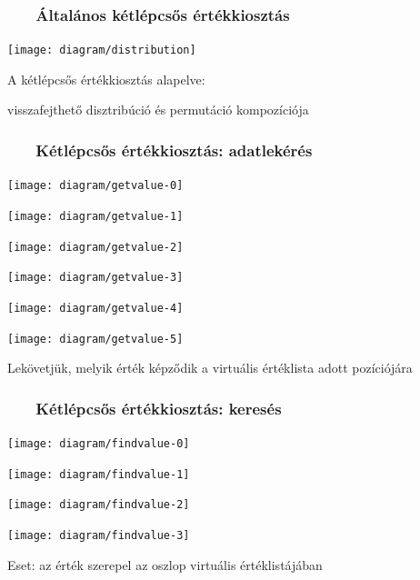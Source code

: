 \documentclass[
    aspectratio=169,
]{beamer}
\newcommand{\slidetitle}[2]{\frametitle{{\small #1 ~ \ding{226} ~ } \normalsize \textbf{#2} }}
\begin{document}
\begin{frame}
    \slidetitle{\sectionshorttitle}{Általános kétlépcsős értékkiosztás}
    
    \centering
    
    \texttt{[image: diagram/distribution]}
    
    A kétlépcsős értékkiosztás alapelve: \par
    visszafejthető disztribúció és permutáció kompozíciója
\end{frame}

\begin{frame}
    \slidetitle{\sectionshorttitle}{Kétlépcsős értékkiosztás: adatlekérés}
    
    \centering
    
    \begin{overprint}
        \centerline{\texttt{[image: diagram/getvalue-0]}}
        \centerline{\texttt{[image: diagram/getvalue-1]}}
        \centerline{\texttt{[image: diagram/getvalue-2]}}
        \centerline{\texttt{[image: diagram/getvalue-3]}}
        \centerline{\texttt{[image: diagram/getvalue-4]}}
        \centerline{\texttt{[image: diagram/getvalue-5]}}
    \end{overprint}
    
    \hspace{0.7cm}
    
    Lekövetjük, melyik érték képződik a virtuális értéklista adott pozíciójára
\end{frame}

\begin{frame}
    \slidetitle{\sectionshorttitle}{Kétlépcsős értékkiosztás: keresés}
    
    \centering
    
    \begin{overprint}
        \centerline{\texttt{[image: diagram/findvalue-0]}}
        \centerline{\texttt{[image: diagram/findvalue-1]}}
        \centerline{\texttt{[image: diagram/findvalue-2]}}
        \centerline{\texttt{[image: diagram/findvalue-3]}}
    \end{overprint}
    
    \vspace{0.7cm}
    
    Eset: az érték szerepel az oszlop virtuális értéklistájában
\end{frame}
\end{document}
